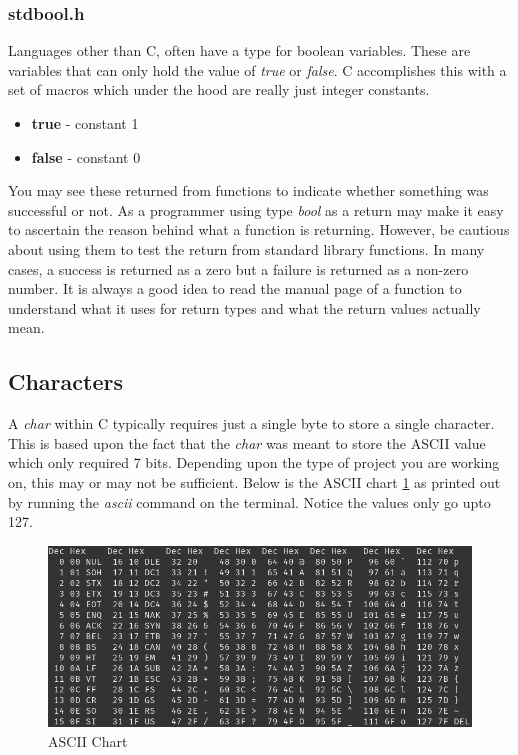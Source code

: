 \documentclass[../main.tex]{subfiles}
\begin{document}
	\subsubsection{stdbool.h}
	Languages other than C, often have a type for boolean variables.  These are variables that can only hold the value of \textit{true} or \textit{false}.  C accomplishes this with a set of macros which under the hood are really just integer constants.
	
	\begin{itemize}
		\item \textbf{true} - constant 1
		\item \textbf{false} - constant 0
	\end{itemize}

	You may see these returned from functions to indicate whether something was successful or not.  As a programmer using type \textit{bool} as a return may make it easy to ascertain the reason behind what a function is returning.  However, be cautious about using them to test the return from standard library functions.  In many cases, a success is returned as a zero but a failure is returned as a non-zero number.  It is always a good idea to read the manual page of a function to understand what it uses for return types and what the return values actually mean. 

	\subsection{Characters}
	
	A \textit{char} within C typically requires just a single byte to store a single character.  This is based upon the fact that the \textit{char} was meant to store the ASCII value which only required 7 bits.  Depending upon the type of project you are working on, this may or may not be sufficient. Below is the ASCII chart \ref{fig:ascii} as printed out by running the \textit{ascii} command on the terminal.  Notice the values only go upto 127.
	
	\begin{figure}[h]
		\centering\includegraphics[scale=0.5]{ascii.png}
		\caption{ASCII Chart}
		\label{fig:ascii} %
	\end{figure}
	
\end{document}
